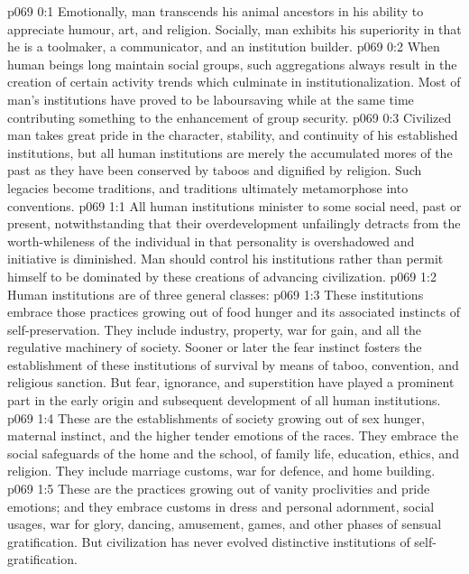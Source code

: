 \author{Melchizedek}
\vs p069 0:1 Emotionally, man transcends his animal ancestors in his ability to appreciate humour, art, and religion. Socially, man exhibits his superiority in that he is a toolmaker, a communicator, and an institution builder.
\vs p069 0:2 When human beings long maintain social groups, such aggregations always result in the creation of certain activity trends which culminate in institutionalization. Most of man’s institutions have proved to be laboursaving while at the same time contributing something to the enhancement of group security.
\vs p069 0:3 Civilized man takes great pride in the character, stability, and continuity of his established institutions, but all human institutions are merely the accumulated mores of the past as they have been conserved by taboos and dignified by religion. Such legacies become traditions, and traditions ultimately metamorphose into conventions.
\vs p069 1:1 All human institutions minister to some social need, past or present, notwithstanding that their overdevelopment unfailingly detracts from the worth\hyp{}whileness of the individual in that personality is overshadowed and initiative is diminished. Man should control his institutions rather than permit himself to be dominated by these creations of advancing civilization.
\vs p069 1:2 \pc Human institutions are of three general classes:
\vs p069 1:3 \bibnobreakspace {} These institutions embrace those practices growing out of food hunger and its associated instincts of self\hyp{}preservation. They include industry, property, war for gain, and all the regulative machinery of society. Sooner or later the fear instinct fosters the establishment of these institutions of survival by means of taboo, convention, and religious sanction. But fear, ignorance, and superstition have played a prominent part in the early origin and subsequent development of all human institutions.
\vs p069 1:4 \bibnobreakspace {} These are the establishments of society growing out of sex hunger, maternal instinct, and the higher tender emotions of the races. They embrace the social safeguards of the home and the school, of family life, education, ethics, and religion. They include marriage customs, war for defence, and home building.
\vs p069 1:5 \bibnobreakspace {} These are the practices growing out of vanity proclivities and pride emotions; and they embrace customs in dress and personal adornment, social usages, war for glory, dancing, amusement, games, and other phases of sensual gratification. But civilization has never evolved distinctive institutions of self\hyp{}gratification.
